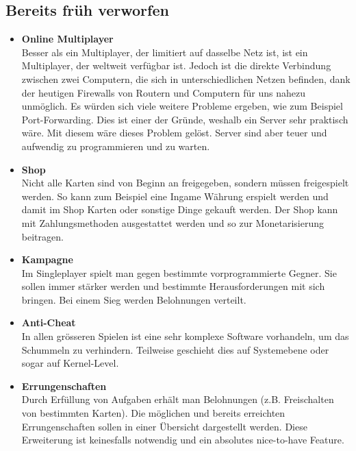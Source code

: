 \subsection{Bereits früh verworfen}
\begin{itemize}
    \item \textbf{Online Multiplayer} \\
        Besser als ein Multiplayer, der limitiert auf dasselbe Netz ist, ist ein Multiplayer, der weltweit verfügbar ist. Jedoch ist die direkte Verbindung zwischen zwei Computern, die sich in unterschiedlichen Netzen befinden, dank der heutigen Firewalls von Routern und Computern für uns nahezu unmöglich. 
        Es würden sich viele weitere Probleme ergeben, wie zum Beispiel Port-Forwarding. Dies ist einer der Gründe, weshalb ein Server sehr praktisch wäre. Mit diesem wäre dieses
        Problem gelöst. Server sind aber teuer und aufwendig zu programmieren und zu warten. 
    \item \textbf{Shop} \\
        Nicht alle Karten sind von Beginn an freigegeben, sondern müssen freigespielt werden.
        So kann zum Beispiel eine Ingame Währung erspielt werden und damit im Shop Karten oder sonstige Dinge gekauft werden.
        Der Shop kann mit Zahlungsmethoden ausgestattet werden und so zur Monetarisierung beitragen.
    \item \textbf{Kampagne} \\
        Im Singleplayer spielt man gegen bestimmte vorprogrammierte Gegner. Sie sollen immer stärker werden und bestimmte Herausforderungen mit sich bringen.
        Bei einem Sieg werden Belohnungen verteilt.
    \item \textbf{Anti-Cheat} \\
        In allen grösseren Spielen ist eine sehr komplexe Software vorhandeln, um das Schummeln zu verhindern.
        Teilweise geschieht dies auf Systemebene oder sogar auf Kernel-Level.
    \item \textbf{Errungenschaften} \\
        Durch Erfüllung von Aufgaben erhält man Belohnungen (z.B. Freischalten von bestimmten Karten). 
        Die möglichen und bereits erreichten Errungenschaften sollen in einer Übersicht dargestellt werden. 
        Diese Erweiterung ist keinesfalls notwendig und ein absolutes nice-to-have Feature.
\end{itemize} 

